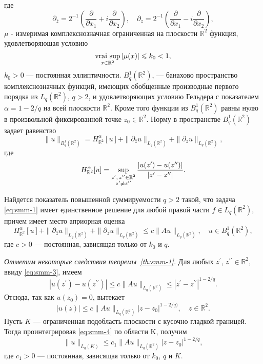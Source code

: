 	где 
	$$
	\partial_{\bar{z}}=2^{-1}\left(\frac{\partial}{\partial x_1}+i\frac{\partial}{\partial x_2}\right),\quad \partial_{z}=2^{-1}\left(\frac{\partial}{\partial x_1}-i\frac{\partial}{\partial x_2}\right),
	$$
	 $\mu$ - измеримая комплекснозначная ограниченная на плоскости $\mathbb{R}^2$ функция, удовлетворяющая условию
\begin{equation}\label{eq:smm-2}
\mathop{\rm vrai\ sup}_{x\in \mathbb{R}^2} |\mu(x)|\leqslant k_0<1,
\end{equation}      
	$k_0>0$ --- постоянная эллиптичности.
	$B_q^1 (\mathbb{R}^2)$, --- банахово пространство комплекснозначных функций, имеющих обобщенные производные первого порядка из $L_q (\mathbb{R}^2)$, $q>2$, и удовлетворяющих условию Гельдера с показателем $\alpha=1-2/q$  на всей плоскости $\mathbb{R}^2$. Кроме того функции из $B_q^1 (\mathbb{R}^2)$ равны нулю в произвольной фиксированной точке $z_0\in \mathbb{R}^2$. Норму в пространстве $B_q^1 (\mathbb{R}^2)$ задает равенство
	$$\|u\|_{B_q^1 (\mathbb{R}^2)}=H_{\mathbb{R}^2}^\alpha [u]+\|\partial_{\bar{z} }u\|_{L_q (\mathbb{R}^2)}+\|\partial_z u\|_{L_q (\mathbb{R}^2)},$$
	где
	$$H_{{\mathbb{R}^2}}^\alpha [u]=\mathop{\rm sup}\limits_{\substack {z^\prime,\, z^{\prime\prime}\in\mathbb{R}^2\\z^\prime\ne z^{\prime\prime}}}\frac{|u(z^\prime
		)-u(z^{\prime\prime})|}{|z^\prime-z^{\prime\prime}|}.$$
	
	\begin{theorem}\label{th:smm-1}
		Найдется показатель повышенной суммируемости $q>2$ такой, что задача \eqref{eq:smm-1} имеет единственное решение для любой правой части $f\in L_q(\mathbb{R}^2)$, причем имеет место априорная оценка 
	\begin{equation}\label{eq:smm-3}
	H_{\mathbb{R}^2}^\alpha [u]+\|\partial_{\bar{z} }u\|_{L_q (\mathbb{R}^2)}+\|\partial_z u\|_{L_q (\mathbb{R}^2)}\leqslant c\|Au\|_{L_q(\mathbb{R}^2)}, \quad u\in B_q^1({\mathbb R}^2),
	\end{equation}
		где $c >0$ --- постоянная, зависящая только от $k_0$ и $q$. 
	\end{theorem}
	
	\textit{Отметим некоторые следствия теоремы~\ref{th:smm-1}.} Для любых  $z^\prime$, $z^{\prime\prime}\in {\mathbb R}^2$, ввиду \eqref{eq:smm-3}, имеем
	$$|u(z^\prime)-u(z^{\prime\prime})| \leqslant c\|Au\|_{L_q ({\mathbb R}^2) }\leqslant |z^\prime-z^{\prime\prime}|^{1-2/q}.$$
	Отсюда, так как $u(z_0 )=0$, вытекает
	\begin{equation}\label{eq:smm-4}
|u(z)|\leqslant c\|Au\|_{L_q ({\mathbb R}^2 )} |z-z_0 |^{1-2/q)},\quad z\in {\mathbb R}^2.
\end{equation}                           
	Пусть $K$ --- ограниченная подобласть плоскости с кусочно гладкой границей. Тогда проинтегрировав \eqref{eq:smm-4} по области K, получим
\begin{equation*}%
\|u\|_{L_q (K) }\leqslant c_1 \|Au\|_{L_q ({\mathbb R}^2 )}|z-z_0|^{1-2/q}, 
\end{equation*}                                      
	где $c_1>0$ --- постоянная, зависящая только от $k_0$, $q$ и $K$.

